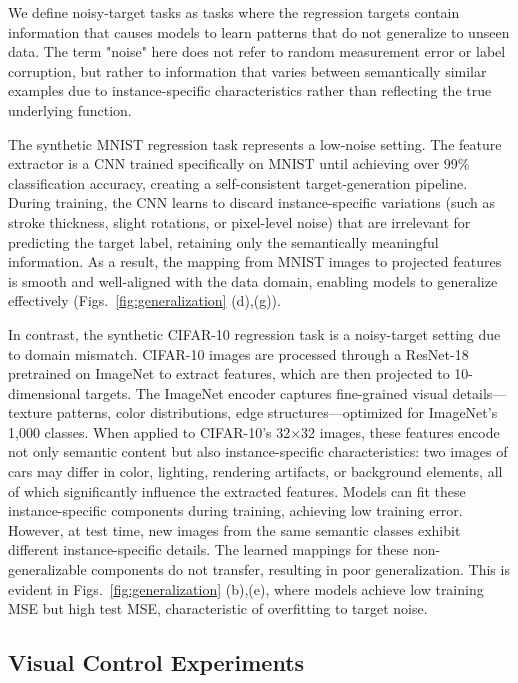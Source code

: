 

We define noisy-target tasks as tasks where the regression targets contain information that causes models to learn patterns that do not generalize to unseen data. The term "noise" here does not refer to random measurement error or label corruption, but rather to information that varies between semantically similar examples due to instance-specific characteristics rather than reflecting the true underlying function.

The synthetic MNIST regression task represents a low-noise setting. The feature extractor is a CNN trained specifically on MNIST until achieving over 99\% classification accuracy, creating a self-consistent target-generation pipeline. During training, the CNN learns to discard instance-specific variations (such as stroke thickness, slight rotations, or pixel-level noise) that are irrelevant for predicting the target label, retaining only the semantically meaningful information. As a result, the mapping from MNIST images to projected features is smooth and well-aligned with the data domain, enabling models to generalize effectively (Figs.~\ref{fig:generalization} (d),(g)).


In contrast, the synthetic CIFAR-10 regression task is a noisy-target setting due to domain mismatch. CIFAR-10 images are processed through a ResNet-18 pretrained on ImageNet to extract features, which are then projected to 10-dimensional targets. The ImageNet encoder captures fine-grained visual details—texture patterns, color distributions, edge structures—optimized for ImageNet's 1,000 classes. When applied to CIFAR-10's 32×32 images, these features encode not only semantic content but also instance-specific characteristics: two images of cars may differ in color, lighting, rendering artifacts, or background elements, all of which significantly influence the extracted features.
Models can fit these instance-specific components during training, achieving low training error. However, at test time, new images from the same semantic classes exhibit different instance-specific details. The learned mappings for these non-generalizable components do not transfer, resulting in poor generalization. This is evident in Figs.~\ref{fig:generalization} (b),(e), where models achieve low training MSE but high test MSE, characteristic of overfitting to target noise.


\subsection{Visual Control Experiments} \label{appx:vd4rl}
 
